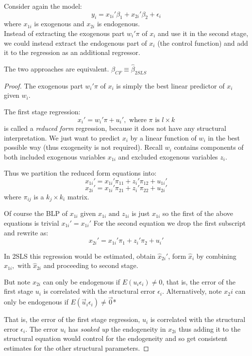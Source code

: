 \documentclass[DIV=14,titlepage=false]{scrreprt}
\begin{document}
Consider again the model:
\[y_i=x_{1i}'\beta_1+x_{2i}'\beta_2+\epsilon_i\]
where \(x_{1i}\) is exogenous and \(x_{2i}\) is endogenous.
\\ Instead of extracting the exogenous part \(w_i'\pi\) of \(x_i\) and use it in the second stage, we could instead extract the endogenous part of \(x_i\) (the control function) and add it to the regression as an additional regressor.

\begin{theorem}
The two approaches are equivalent. \(\hat\beta_{CF}\equiv\hat\beta_{2SLS}\)
\end{theorem}
\vspace{5mm}
\begin{proof}
The exogenous part \(w_i'\pi\) of \(x_i\) is simply the best linear predictor of \(x_i\) given \(w_i\).

The first stage regression:
\[x_i'=w_i'\pi+u_i', \text{ where }\pi \text{ is } l\times k\]
is called a \textit{reduced form} regression, because it does not have any structural interpretation. We just want to predict \(x_i\) by a linear function of \(w_i\) in the best possible way (thus exogeneity is not required).
Recall \(w_i\) contains components of both included exogenous variables \(x_{1i}\) and excluded exogenous variables \(z_i\).

Thus we partition the reduced form equations into:
\[x_{1i}'=x_{1i}'\pi_{11}+z_i'\pi_{12}+u_{1i}'\]
\[x_{2i}'=x_{1i}'\pi_{21}+z_i'\pi_{22}+u_{2i}'\]
where \(\pi_{ij}\) is a \(k_j\times k_i\) matrix.

Of course the BLP of \(x_{1i}\) given \(x_{1i}\text{ and }z_{1i}\) is just \(x_{1i}\) so the first of the above equations is trivial \(x_{1i}'=x_{1i}'\)
For the second equation we drop the first subscript and rewrite as:
\[x_{2i}'=x_{1i}'\pi_{1}+z_i'\pi_{2}+u_{i}'\]

In 2SLS this regression would be estimated, obtain \(\hat x_{2i}'\), form \(\hat x_i\) by combining \(x_{1i},\text{ with }\hat x_{2i}\) and proceeding to second stage.

But note \(x_{2i}\) can only be endogenous if \(E(u_i\epsilon_i)\neq0\), that is, the error of the first stage \(u_i\) is correlated with the structural error \(\epsilon_i\).
Alternatively, note \(x_2i\) can only be endogenous if \(E(\vec u_i \epsilon_i)\neq\vec0\)*

That is, the error of the first stage regression, \(u_i\) is correlated with the structural error \(\epsilon_i\). 
The error \(u_i\) has \textit{soaked up} the endogeneity in \(x_{2i}\) thus adding it to the structural equation would control for the endogeneity and so get consistent estimates for the other structural parameters.


\end{proof}
\end{document}
